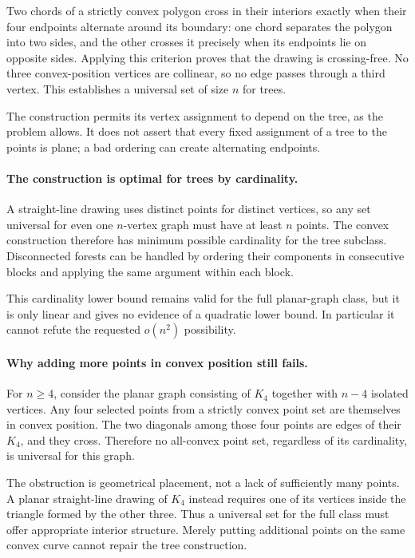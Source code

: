 \documentclass[11pt,a4paper]{article}
\begin{document}
Two chords of a strictly convex polygon cross in their interiors exactly when their four endpoints alternate around its boundary: one chord separates the polygon into two sides, and the other crosses it precisely when its endpoints lie on opposite sides. Applying this criterion proves that the drawing is crossing-free. No three convex-position vertices are collinear, so no edge passes through a third vertex. This establishes a universal set of size $n$ for trees.

The construction permits its vertex assignment to depend on the tree, as the problem allows. It does not assert that every fixed assignment of a tree to the points is plane; a bad ordering can create alternating endpoints.

\paragraph{The construction is optimal for trees by cardinality.}
A straight-line drawing uses distinct points for distinct vertices, so any set universal for even one $n$-vertex graph must have at least $n$ points. The convex construction therefore has minimum possible cardinality for the tree subclass. Disconnected forests can be handled by ordering their components in consecutive blocks and applying the same argument within each block.

This cardinality lower bound remains valid for the full planar-graph class, but it is only linear and gives no evidence of a quadratic lower bound. In particular it cannot refute the requested $o(n^2)$ possibility.

\paragraph{Why adding more points in convex position still fails.}
For $n\ge4$, consider the planar graph consisting of $K_4$ together with $n-4$ isolated vertices. Any four selected points from a strictly convex point set are themselves in convex position. The two diagonals among those four points are edges of their $K_4$, and they cross. Therefore no all-convex point set, regardless of its cardinality, is universal for this graph.

The obstruction is geometrical placement, not a lack of sufficiently many points. A planar straight-line drawing of $K_4$ instead requires one of its vertices inside the triangle formed by the other three. Thus a universal set for the full class must offer appropriate interior structure. Merely putting additional points on the same convex curve cannot repair the tree construction.
\end{document}
